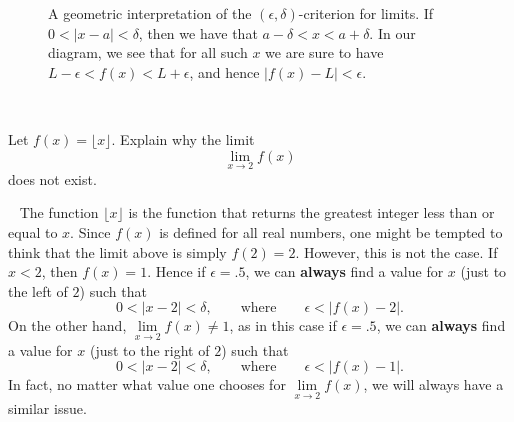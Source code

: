 \begin{figure}[H]
	\centering
	\caption{A geometric interpretation of the
	  $(\epsilon,\delta)$-criterion for limits.  If $0<|x-a|<\delta$, then we have that $a
	  -\delta < x < a+\delta$. In our diagram, we see that for all such
	  $x$ we are sure to have $L - \epsilon< f(x) < L+\epsilon$, and hence
	  $|f(x) - L|<\epsilon$.}
	\label{figure:epsilon-delta}
\end{figure}
~\newline
\begin{example}
	Let $f(x) = \lfloor x\rfloor$. Explain why the limit
	$$\lim_{x\to 2} f(x)$$
	\quad does not exist.
	~\newline
	\begin{solution}~\newline
		The function $\lfloor x \rfloor$ is the function that returns the
		greatest integer less than or equal to $x$. Since $f(x)$ is defined
		for all real numbers, one might be tempted to think that the limit
		above is simply $f(2) = 2$. However, this is not the case.  If $x<2$,
		then $f(x) =1$. Hence if $\epsilon = .5$, we can \textbf{always} find
		a value for $x$ (just to the left of $2$) such that
		$$
		0< |x -2|< \delta, \qquad\text{where} \qquad \epsilon < |f(x)-2|.
		$$
		On the other hand, $\lim\limits_{x\to 2} f(x)\ne 1$, as in this case if
		$\epsilon=.5$, we can \textbf{always} find a value for $x$ (just to
		the right of $2$) such that
		$$
		0<|x- 2|<\delta, \qquad\text{where} \qquad  \epsilon<|f(x)-1|.
		$$
		In fact, no matter what value one
		chooses for $\lim\limits_{x\to 2} f(x)$, we will always have a similar
		issue.
	\end{solution}
\end{example}

